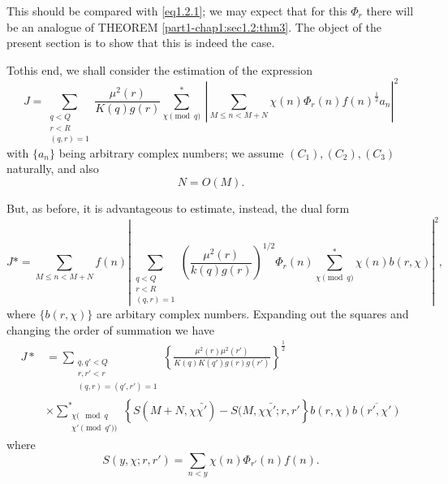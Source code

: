 This should be compared with \eqref{eq1.2.1}; we may expect that for this
$\Phi_r$ there will be an analogue of THEOREM
\ref{part1-chap1:sec1.2:thm3}. The object of 
the present section is to show that this is indeed the case. 

To\pageoriginale this end, we shall consider the estimation of the
expression 
$$
J = \sum_{\substack{q < Q \\ r < R \\ (q,r)=1}}
\frac{\mu^2(r)}{K(q)g(r)}  \sum^*_{\chi \pmod{q}} ~  |
\sum_{M \leq n < M+N} \chi (n) \Phi_r (n)f(n)^{\frac{1}{2}} a_n
|^2 
$$
with $\{ a_n\}$ being arbitrary complex numbers; we assume $(C_1),
(C_2),(C_3)$ naturally, and also 
$$
N = O(M).
$$

But, as before, it is advantageous to estimate, instead, the dual form
$$
J* = \sum_{M \leq n < M+N} f(n) |  \sum_{\substack{q < Q
    \\ r < R \\ (q, r)=1}} \left(
\frac{\mu^2(r)}{k(q)g(r)}\right)^{1/2} \Phi_r (n) \sum^*_{\chi
  \pmod{q}} \chi (n) b (r, \chi)|^2,
$$
where $\{ b(r,\chi)\}$ are arbitary complex numbers. Expanding
out the squa\-res and changing the order of summation we have 
\begin{align*}
  J* & = \sum_{\substack{q,q' < Q \\ r,r' < r \\ (q,r)
      = (q',r')=1}} \left\{ \frac{\mu^2 (r) \mu^2 (r')}{K(q) K
    (q') g(r)g(r')} \right\}^{\frac{1}{2}}\\ 
  & \times \sum_{\substack{ \chi (\mod q\\ \chi'\pmod{q'})}}^{*} \left\{ S(M+N,
  \chi \bar{\chi'}) - S(M, \chi \bar{\chi'};r, r'\right\}
  b(r,\chi) \overline{b(r', \chi')} \tag{1.4.11}\label{eq1.4.11}
\end{align*}
where
$$
S(y,\chi;r, r') = \sum_{n < y} \chi(n) \Phi_{r'} (n) f(n).
$$


